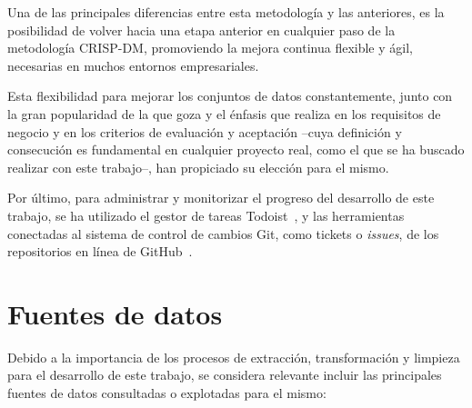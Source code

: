Una de las principales diferencias entre esta metodología y las anteriores, es la posibilidad de volver hacia una etapa anterior en cualquier paso de la metodología CRISP-DM, promoviendo la mejora continua flexible y ágil, necesarias en muchos entornos empresariales.

Esta flexibilidad para mejorar los conjuntos de datos constantemente, junto con la gran popularidad de la que goza y el énfasis que realiza en los requisitos de negocio y en los criterios de evaluación y aceptación –cuya definición y consecución es fundamental en cualquier proyecto real, como el que se ha buscado realizar con este trabajo–, han propiciado su elección para el mismo.

Por último, para administrar y monitorizar el progreso del desarrollo de este trabajo, se ha utilizado el gestor de tareas Todoist~\cite{todoist}, y las herramientas conectadas al sistema de control de cambios Git, como tickets o \textit{issues}, de los repositorios en línea de GitHub~\cite{github}.

\section{Fuentes de datos}

Debido a la importancia de los procesos de extracción, transformación y limpieza para el desarrollo de este trabajo, se considera relevante incluir las principales fuentes de datos consultadas o explotadas para el mismo:

